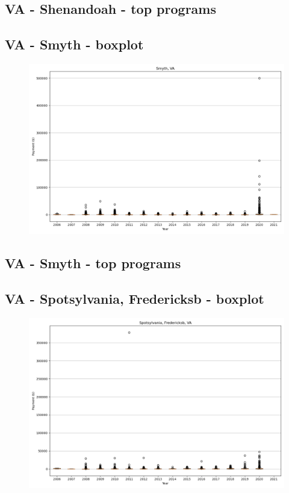 \subsection*{VA - Shenandoah - top programs}

\newpage
\subsection*{VA - Smyth - boxplot}
\begin{figure}[h]
\centering
\includegraphics[width=7in]{../output/boxplots/counties/Smyth-VA_boxplot.png}
\end{figure}


\subsection*{VA - Smyth - top programs}

\newpage
\subsection*{VA - Spotsylvania, Fredericksb - boxplot}
\begin{figure}[h]
\centering
\includegraphics[width=7in]{../output/boxplots/counties/Spotsylvania, Fredericksb-VA_boxplot.png}
\end{figure}


